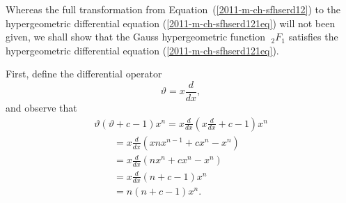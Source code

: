 {\color{OliveGreen}
\bproof

Whereas the full transformation from Equation~(\ref{2011-m-ch-sfhserd12})
to the hypergeometric differential equation  (\ref{2011-m-ch-sfhserd121eq}) will not been given, we shall show that
the Gauss hypergeometric function ${\;}_2F_1$ satisfies the hypergeometric differential equation (\ref{2011-m-ch-sfhserd121eq}).

First, define the differential operator
\begin{equation}
\vartheta = x \frac{d}{dx} ,
\label{2011-m-ch-sfhserddovt}
\end{equation}
and observe that
\begin{equation}
\begin{split}
\vartheta (\vartheta +c-1) x^n
=x \frac{d}{dx} \left( x \frac{d}{dx} +c-1\right) x^n\\  \qquad
=x \frac{d}{dx} \left( x n  x^{n-1}+c x^n- x^n\right)\\  \qquad
=x \frac{d}{dx} \left(   n  x^{n}+c x^n- x^n\right)\\     \qquad
=x \frac{d}{dx} \left(  n +c-1\right) x^n\\              \qquad
=n\left(  n +c-1\right) x^n.
\end{split}
\label{2011-m-ch-sfhserddovd1}
\end{equation}

}

